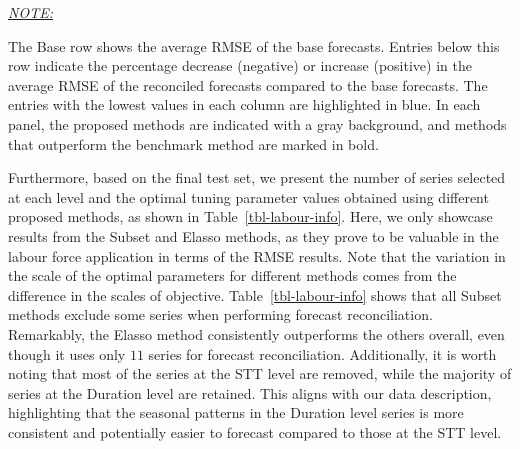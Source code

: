 \documentclass[11pt,a4paper,]{article}
\begin{document}
\begin{table}[!h]
{\begin{threeparttable}
\begin{tabular}{lrrrrrlrrrrrlrrrrrlrr}
\bottomrule
\end{tabular}
\begin{tablenotes}[para]
\item \underline{\textit{NOTE:}} 
\item The Base row shows the average RMSE of the base forecasts. Entries below this row indicate the percentage decrease (negative) or increase (positive) in the average RMSE of the reconciled forecasts compared to the base forecasts. The entries with the lowest values in each column are highlighted in blue. In each panel, the proposed methods are indicated with a gray background, and methods that outperform the benchmark method are marked in bold.
\end{tablenotes}
\end{threeparttable}}
\end{table}

Furthermore, based on the final test set, we present the number of
series selected at each level and the optimal tuning parameter values
obtained using different proposed methods, as shown in
Table~\ref{tbl-labour-info}. Here, we only showcase results from the
Subset and Elasso methods, as they prove to be valuable in the labour
force application in terms of the RMSE results. Note that the variation
in the scale of the optimal parameters for different methods comes from
the difference in the scales of objective. Table~\ref{tbl-labour-info}
shows that all Subset methods exclude some series when performing
forecast reconciliation. Remarkably, the Elasso method consistently
outperforms the others overall, even though it uses only \(11\) series
for forecast reconciliation. Additionally, it is worth noting that most
of the series at the STT level are removed, while the majority of series
at the Duration level are retained. This aligns with our data
description, highlighting that the seasonal patterns in the Duration
level series is more consistent and potentially easier to forecast
compared to those at the STT level.
\end{document}
